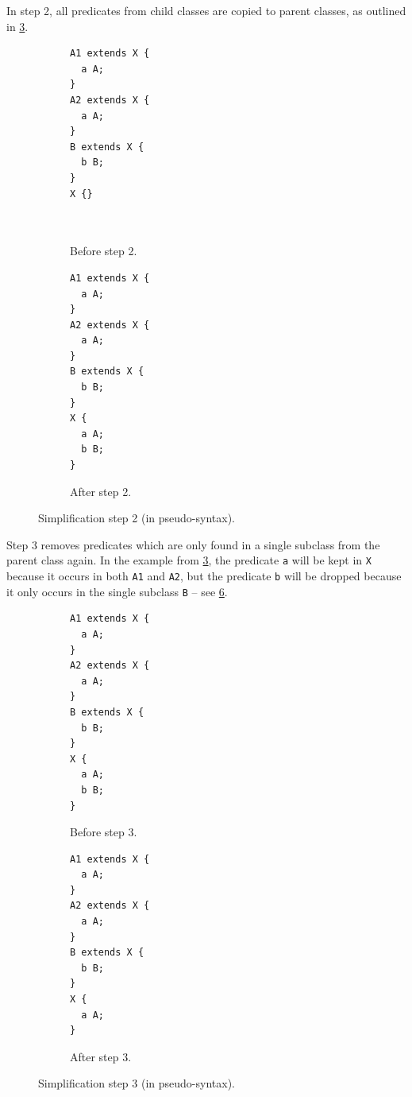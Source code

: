 
In step 2, all predicates from child classes are copied to parent classes,
as outlined in \cref{fig:simplify-7.4.2}.

\begin{figure}[ht]
  \begin{subfigure}[t]{0.45\textwidth}
    \begin{lstlisting}[showlines=true]
A1 extends X {
  a A;
}
A2 extends X {
  a A;
}
B extends X {
  b B;
}
X {}



    \end{lstlisting}
    \caption{Before step 2.}
    \label{fig:simplify-7.4.2-before}
  \end{subfigure}
  \begin{subfigure}[t]{0.45\textwidth}
    \begin{lstlisting}
A1 extends X {
  a A;
}
A2 extends X {
  a A;
}
B extends X {
  b B;
}
X {
  a A;
  b B;
}
    \end{lstlisting}
    \caption{After step 2.}
    \label{fig:simplify-7.4.2-after}
  \end{subfigure}
  \caption[Simplification step 2.]{Simplification step 2 (in pseudo-syntax).}
  \label{fig:simplify-7.4.2}
\end{figure}

Step 3  removes predicates which are only found in a single subclass
from the parent class again.
In the example from \cref{fig:simplify-7.4.2},
the predicate \lstinline{a} will be kept in \lstinline{X}
because it occurs in both \lstinline{A1} and \lstinline{A2},
but the predicate \lstinline{b} will be dropped
because it only occurs in the single subclass \lstinline{B} –
see \cref{fig:simplify-7.4.3}.

\begin{figure}[ht]
  \begin{subfigure}[t]{0.45\textwidth}
    \begin{lstlisting}
A1 extends X {
  a A;
}
A2 extends X {
  a A;
}
B extends X {
  b B;
}
X {
  a A;
  b B;
}
    \end{lstlisting}
    \caption{Before step 3.}
    \label{fig:simplify-7.4.3-before}
  \end{subfigure}
  \begin{subfigure}[t]{0.45\textwidth}
    \begin{lstlisting}[showlines=true]
A1 extends X {
  a A;
}
A2 extends X {
  a A;
}
B extends X {
  b B;
}
X {
  a A;
}

    \end{lstlisting}
    \caption{After step 3.}
    \label{fig:simplify-7.4.3-after}
  \end{subfigure}
  \caption[Simplification step 3.]{Simplification step 3 (in pseudo-syntax).}
  \label{fig:simplify-7.4.3}
\end{figure}


